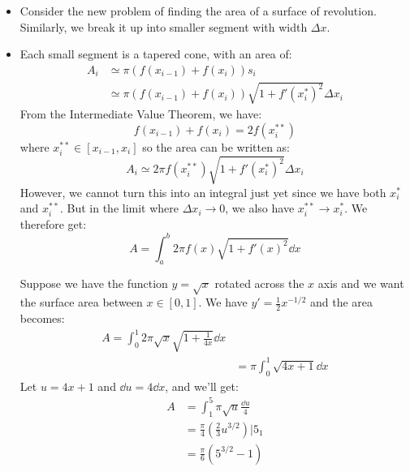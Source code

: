 \begin{itemize}
    \item Consider the new problem of finding the area of a surface of revolution. Similarly, we break it up into smaller segment with width $\Delta x$.
    \begin{figure}[ht]
        \centering
    \end{figure}
    \item Each small segment is a tapered cone, with an area of:
    \begin{align}
        A_i &\simeq \pi (f(x_{i-1})+f(x_i))s_i \\ 
        &\simeq \pi (f(x_{i-1})+f(x_i))\sqrt{1+f'(x_i^*)^2} \Delta x_{i}
    \end{align}
    From the Intermediate Value Theorem, we have:
    \begin{equation}
        f(x_{i-1})+f(x_i) = 2f(x_{i}^{**})
    \end{equation}
    where $x_i^{**} \in [x_{i-1},x_{i}]$ so the area can be written as:
    \begin{equation}
        A_i \simeq 2\pi f(x_{i}^{**})\sqrt{1+f'(x_{i}^*)^2}\Delta x_i
    \end{equation}
    However, we cannot turn this into an integral just yet since we have both $ x_i^*$ and $ x_i^{**}$. But in the limit where $\Delta x_i \to 0$, we also have $x_{i}^{**} \to x_{i}^*$. We therefore get:
    \begin{equation}
        A = \int_a^b 2\pi f(x)\sqrt{1+f'(x)^2} \dd{x}
    \end{equation}
    \begin{example}
        Suppose we have the function $y=\sqrt{x}$ rotated across the $x$ axis and we want the surface area between $x\in [0,1]$. We have $y' = \frac{1}{2}x^{-1/2}$ and the area becomes:
        \begin{align}
            A = \int_0^1 2\pi \sqrt{x} \sqrt{1+\frac{1}{4x}}\dd{x} \\ 
            &= \pi \int_0^1 \sqrt{4x+1} \dd{x}
        \end{align}
        Let $u=4x+1$ and $\dd{u}=4\dd{x}$, and we'll get:
        \begin{align}
            A &= \int_1^5 \pi \sqrt{u} \frac{\dd{u}}{4} \\
            &= \frac{\pi}{4}\left(\frac{2}{3}u^{3/2}\right)\Biggr|5_1 \\ 
            &= \frac{\pi}{6}(5^{3/2}-1)
        \end{align}
    \end{example}
\end{itemize}